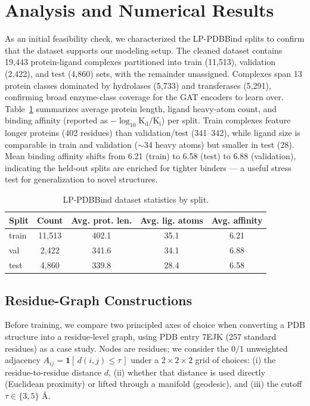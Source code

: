 \documentclass[conference]{IEEEtran}
\begin{document}
\section{Analysis and Numerical Results}
As an initial feasibility check, we characterized the LP-PDBBind splits to confirm that the dataset supports our modeling setup. The cleaned dataset contains 19{,}443 protein-ligand complexes partitioned into train (11{,}513), validation (2{,}422), and test (4{,}860) sets, with the remainder unassigned. Complexes span 13 protein classes dominated by hydrolases (5{,}733) and transferases (5{,}291), confirming broad enzyme-class coverage for the GAT encoders to learn over. Table~\ref{tab:split_stats} summarizes average protein length, ligand heavy-atom count, and binding affinity (reported as $-\log_{10}\mathrm{K_d/K_i}$) per split. Train complexes feature longer proteins (402 residues) than validation/test (341--342), while ligand size is comparable in train and validation ($\sim$34 heavy atoms) but smaller in test (28). Mean binding affinity shifts from 6.21 (train) to 6.58 (test) to 6.88 (validation), indicating the held-out splits are enriched for tighter binders --- a useful stress test for generalization to novel structures.

\begin{table}[htbp]
\caption{LP-PDBBind dataset statistics by split.}
\label{tab:split_stats}
\begin{center}
\begin{tabular}{|l|c|c|c|c|}
\hline
\textbf{Split} & \textbf{Count} & \textbf{Avg. prot. len.} & \textbf{Avg. lig. atoms} & \textbf{Avg. affinity} \\
\hline
train & 11{,}513 & 402.1 & 35.1 & 6.21 \\
val   & 2{,}422  & 341.6 & 34.1 & 6.88 \\
test  & 4{,}860  & 339.8 & 28.4 & 6.58 \\
\hline
\end{tabular}
\end{center}
\end{table}

\subsection{Residue-Graph Constructions}\label{sec:residue_graphs}
Before training, we compare two principled axes of choice when converting a PDB structure into a residue-level graph, using PDB entry 7EJK (257 standard residues) as a case study. Nodes are residues; we consider the $0/1$ unweighted adjacency $A_{ij} = \mathbf{1}[\,d(i,j) \leq \tau\,]$ under a $2\times 2\times 2$ grid of choices: (i) the residue-to-residue distance $d$, (ii) whether that distance is used directly (Euclidean proximity) or lifted through a manifold (geodesic), and (iii) the cutoff $\tau \in \{3, 5\}$ \AA.
\end{document}

